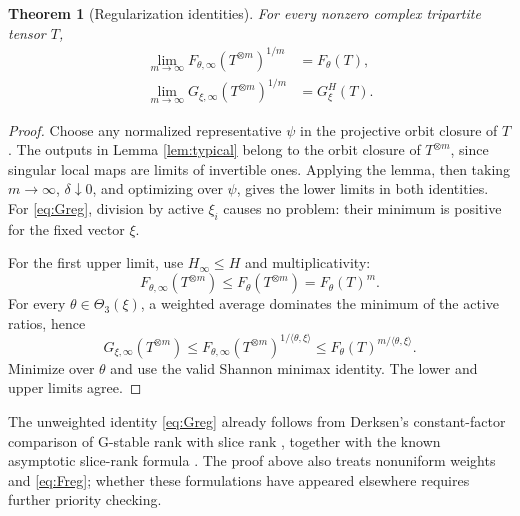 \documentclass[11pt,a4paper]{article}
\newtheorem{theorem}{Theorem}
\newcommand{\Hinf}{H_{\infty}}
\begin{document}
\begin{theorem}[Regularization identities]\label{thm:regular}
For every nonzero complex tripartite tensor \(T\),
\begin{align}
 \lim_{m\to\infty}F_{\theta,\infty}(T^{\otimes m})^{1/m}
 &=F_\theta(T),\label{eq:Freg}\\
 \lim_{m\to\infty}G_{\xi,\infty}(T^{\otimes m})^{1/m}
 &=G_\xi^{H}(T).\label{eq:Greg}
\end{align}
\end{theorem}
\begin{proof}
Choose any normalized representative \(\psi\) in the projective
orbit closure of \(T\). The outputs in Lemma \ref{lem:typical}
belong to the orbit closure of \(T^{\otimes m}\), since singular
local maps are limits of invertible ones. Applying the lemma,
then taking \(m\to\infty\), \(\delta\downarrow0\), and optimizing
over \(\psi\), gives the lower limits in both identities.
For \eqref{eq:Greg}, division by active \(\xi_i\) causes no problem:
their minimum is positive for the fixed vector \(\xi\).

For the first upper limit, use \(\Hinf\le H\) and multiplicativity:
\[
 F_{\theta,\infty}(T^{\otimes m})
 \le F_\theta(T^{\otimes m})=F_\theta(T)^m .
\]
For every \(\theta\in\Theta_3(\xi)\), a weighted average dominates
the minimum of the active ratios, hence
\[
 G_{\xi,\infty}(T^{\otimes m})
 \le F_{\theta,\infty}(T^{\otimes m})^{1/\langle\theta,\xi\rangle}
 \le F_\theta(T)^{m/\langle\theta,\xi\rangle}.
\]
Minimize over \(\theta\) and use the valid Shannon minimax identity.
The lower and upper limits agree.
\end{proof}

The unweighted identity \eqref{eq:Greg} already follows from
Derksen's constant-factor comparison of G-stable rank with slice
rank \cite[Proposition 4.9 and Theorem 5.2]{Derksen}, together with the known asymptotic slice-rank
formula \cite{CLZ}. The proof above also treats nonuniform weights
and \eqref{eq:Freg}; whether these formulations have appeared
elsewhere requires further priority checking.
\end{document}
